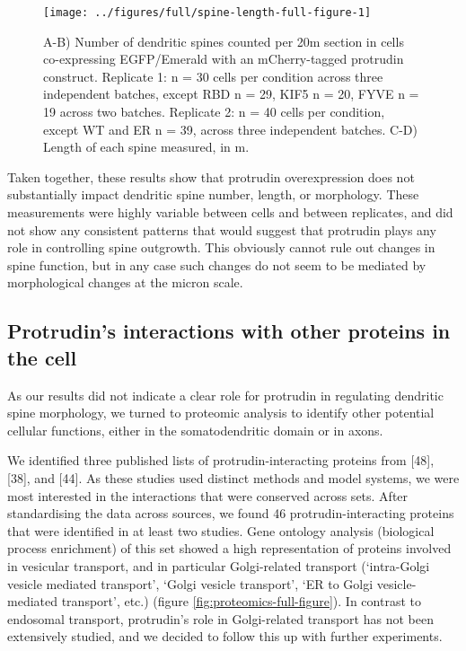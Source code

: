 \documentclass[
  12pt,
  a4paper,
]{book}
\begin{document}
\begin{figure}
\texttt{[image: ../figures/full/spine-length-full-figure-1]} \caption[Protrudin effect on dendritic spine length]{A-B) Number of dendritic spines counted per 20\textmu{}m section in cells co-expressing EGFP/Emerald with an mCherry-tagged protrudin construct.  Replicate 1: n = 30 cells per condition across three independent batches, except \textDelta{}RBD n = 29, \textDelta{}KIF5 n = 20, \textDelta{}FYVE n = 19 across two batches.  Replicate 2: n = 40 cells per condition, except WT and \textDelta{}ER n = 39, across three independent batches. C-D) Length of each spine measured, in \textmu{}m.}\label{fig:spine-length-full-figure}
\end{figure}

Taken together, these results show that protrudin overexpression does not substantially impact dendritic spine number, length, or morphology. These measurements were highly variable between cells and between replicates, and did not show any consistent patterns that would suggest that protrudin plays any role in controlling spine outgrowth. This obviously cannot rule out changes in spine function, but in any case such changes do not seem to be mediated by morphological changes at the micron scale.

\hypertarget{GO-analysis}{%
\subsection{Protrudin's interactions with other proteins in the cell}\label{GO-analysis}}

As our results did not indicate a clear role for protrudin in regulating dendritic spine morphology, we turned to proteomic analysis to identify other potential cellular functions, either in the somatodendritic domain or in axons.

We identified three published lists of protrudin-interacting proteins from {[}48{]}, {[}38{]}, and {[}44{]}. As these studies used distinct methods and model systems, we were most interested in the interactions that were conserved across sets. After standardising the data across sources, we found 46 protrudin-interacting proteins that were identified in at least two studies. Gene ontology analysis (biological process enrichment) of this set showed a high representation of proteins involved in vesicular transport, and in particular Golgi-related transport (`intra-Golgi vesicle mediated transport', `Golgi vesicle transport', `ER to Golgi vesicle-mediated transport', etc.) (figure \ref{fig:proteomics-full-figure}). In contrast to endosomal transport, protrudin's role in Golgi-related transport has not been extensively studied, and we decided to follow this up with further experiments.
\end{document}
